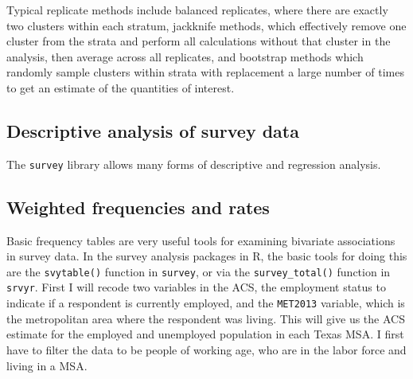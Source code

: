 \documentclass[
]{article}
\begin{document}
Typical replicate methods include balanced replicates, where there are exactly two clusters within each stratum, jackknife methods, which effectively remove one cluster from the strata and perform all calculations without that cluster in the analysis, then average across all replicates, and bootstrap methods which randomly sample clusters within strata with replacement a large number of times to get an estimate of the quantities of interest.

\hypertarget{descriptive-analysis-of-survey-data}{%
\subsection{Descriptive analysis of survey data}\label{descriptive-analysis-of-survey-data}}

The \texttt{survey} library allows many forms of descriptive and regression analysis.

\hypertarget{weighted-frequencies-and-rates}{%
\subsection{Weighted frequencies and rates}\label{weighted-frequencies-and-rates}}

Basic frequency tables are very useful tools for examining bivariate associations in survey data. In the survey analysis packages in R, the basic tools for doing this are the \texttt{svytable()} function in \texttt{survey}, or via the \texttt{survey\_total()} function in \texttt{srvyr}. First I will recode two variables in the ACS, the employment status to indicate if a respondent is currently employed, and the \texttt{MET2013} variable, which is the metropolitan area where the respondent was living. This will give us the ACS estimate for the employed and unemployed population in each Texas MSA. I first have to filter the data to be people of working age, who are in the labor force and living in a MSA.
\end{document}
